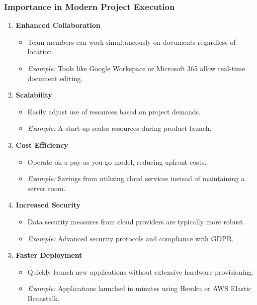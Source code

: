 \documentclass[aspectratio=169]{beamer}
\begin{document}
\begin{frame}[fragile]
    \frametitle{Importance in Modern Project Execution}
    \begin{enumerate}
        \item \textbf{Enhanced Collaboration}
            \begin{itemize}
                \item Team members can work simultaneously on documents regardless of location.
                \item \textit{Example:} Tools like Google Workspace or Microsoft 365 allow real-time document editing.
            \end{itemize}
        \item \textbf{Scalability}
            \begin{itemize}
                \item Easily adjust use of resources based on project demands.
                \item \textit{Example:} A start-up scales resources during product launch.
            \end{itemize}
        \item \textbf{Cost Efficiency}
            \begin{itemize}
                \item Operate on a pay-as-you-go model, reducing upfront costs.
                \item \textit{Example:} Savings from utilizing cloud services instead of maintaining a server room.
            \end{itemize}
        \item \textbf{Increased Security}
            \begin{itemize}
                \item Data security measures from cloud providers are typically more robust.
                \item \textit{Example:} Advanced security protocols and compliance with GDPR.
            \end{itemize}
        \item \textbf{Faster Deployment}
            \begin{itemize}
                \item Quickly launch new applications without extensive hardware provisioning.
                \item \textit{Example:} Applications launched in minutes using Heroku or AWS Elastic Beanstalk.
            \end{itemize}
    \end{enumerate}
\end{frame}
\end{document}
